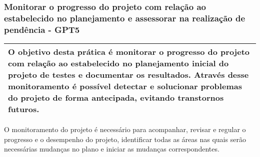 



\subsubsection{Monitorar o progresso do projeto com relação ao estabelecido no planejamento e assessorar na realização de pendência - GPT5}
\label{sec:gpt5}

\begin{table}[H]
\centering
\begin{tabular}{|p{130mm}|}
\hline
O objetivo desta prática é monitorar o progresso do projeto com relação ao estabelecido no planejamento inicial do projeto de testes e documentar os resultados. Através desse monitoramento é possível detectar e solucionar problemas do projeto de forma antecipada, evitando transtornos futuros. \\ 
\hline
\end{tabular}
\end{table}

O monitoramento do projeto é necessário para acompanhar, revisar e regular o progresso e o desempenho do projeto, identificar todas as áreas nas quais serão necessárias mudanças no plano e iniciar as mudanças correspondentes.

